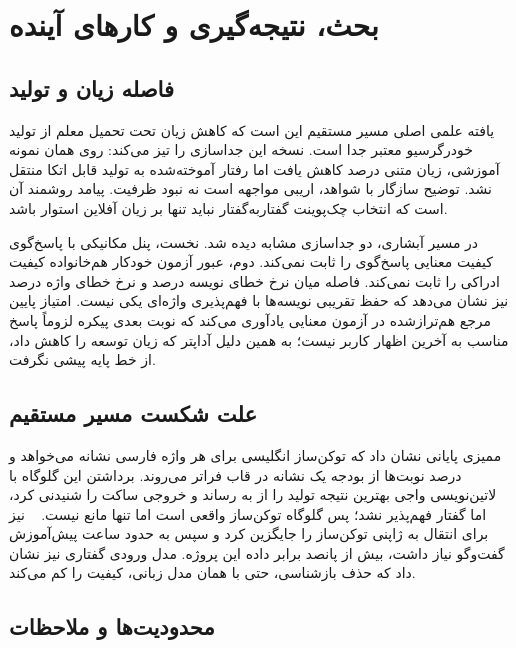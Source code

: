 \chapter{بحث، نتیجه‌گیری و کارهای آینده}
\label{ch:conclusions}

\section{فاصله زیان و تولید}

یافته علمی اصلی مسیر مستقیم این است که کاهش زیان تحت تحمیل معلم از تولید
خودرگرسیو معتبر جدا است. نسخه  این جداسازی را تیز می‌کند: روی همان
 نمونه آموزشی، زیان متنی  درصد کاهش یافت اما رفتار آموخته‌شده
به تولید قابل اتکا منتقل نشد. توضیح سازگار با شواهد، اریبی مواجهه است نه
نبود ظرفیت. پیامد روشمند آن است که انتخاب چک‌پوینت گفتار‌به‌گفتار نباید تنها
بر زیان آفلاین استوار باشد.

در مسیر آبشاری، دو جداسازی مشابه دیده شد. نخست، پنل مکانیکی  با
پاسخ‌گوی  کیفیت معنایی پاسخ‌گوی  را ثابت نمی‌کند. دوم، عبور
آزمون خودکار هم‌خانواده کیفیت ادراکی را ثابت نمی‌کند. فاصله میان نرخ خطای
نویسه  درصد و نرخ خطای واژه  درصد نیز نشان می‌دهد که حفظ
تقریبی نویسه‌ها با فهم‌پذیری واژه‌ای یکی نیست. امتیاز پایین مرجع هم‌ترازشده در آزمون معنایی یادآوری می‌کند که نوبت بعدی
پیکره لزوماً پاسخ مناسب به آخرین اظهار کاربر نیست؛ به همین دلیل آداپتر
 که زیان توسعه را کاهش داد، از خط پایه پیشی نگرفت.

\section{علت شکست مسیر مستقیم}

ممیزی پایانی نشان داد که توکن‌ساز انگلیسی  برای هر واژه فارسی 
نشانه می‌خواهد و  درصد نوبت‌ها از بودجه یک نشانه در قاب فراتر می‌روند.
برداشتن این گلوگاه با لاتین‌نویسی واجی بهترین نتیجه تولید را از  به
 رساند و خروجی ساکت را شنیدنی کرد، اما گفتار فهم‌پذیر نشد؛ پس گلوگاه
توکن‌ساز واقعی است اما تنها مانع نیست. ~\cite{ohashi2025jmoshi} نیز
برای انتقال  به ژاپنی توکن‌ساز را جایگزین کرد و سپس به حدود
 ساعت پیش‌آموزش گفت‌وگو نیاز داشت، بیش از پانصد برابر داده این پروژه. مدل ورودی گفتاری  نیز نشان
داد که حذف بازشناسی، حتی با همان مدل زبانی، کیفیت را کم می‌کند.

\section{محدودیت‌ها و ملاحظات}

